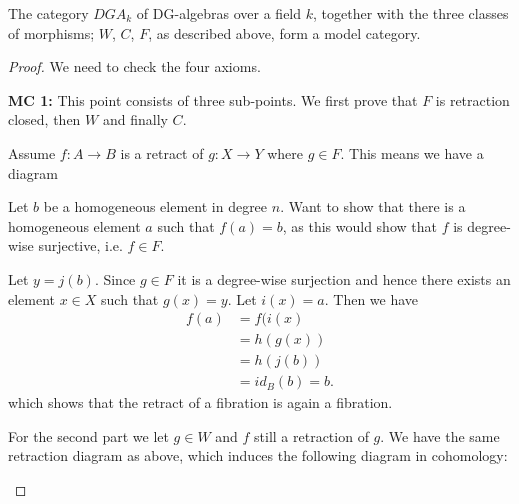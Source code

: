 



\begin{theorem}
The category $DGA_k$ of DG-algebras over a field $k$, together with the three classes of morphisms; $W$, $C$, $F$, as described above, form a model category.
\end{theorem}

\begin{proof}
We need to check the four axioms. 

\textbf{MC 1:} This point consists of three sub-points. We first prove that $F$ is retraction closed, then $W$ and finally $C$. 

Assume $f:A\longrightarrow B$ is a retract of $g:X\longrightarrow Y$ where $g\in F$. This means we have a diagram

\begin{center}
\end{center}

Let $b$ be a homogeneous element in degree $n$. Want to show that there is a homogeneous element $a$ such that $f(a)=b$, as this would show that $f$ is degree-wise surjective, i.e. $f\in F$. 
    
Let $y = j(b)$. Since $g\in F$ it is a degree-wise surjection and hence there exists an element $x\in X$ such that $g(x)=y$. Let $i(x)=a$. Then we have 
\begin{align*}
    f(a) 
    &= f(i(x) \\
    &= h(g(x)) \\
    &= h(j(b)) \\
    &= id_B(b) = b.
\end{align*}
which shows that the retract of a fibration is again a fibration. 

For the second part we let $g\in W$ and $f$ still a retraction of $g$. We have the same retraction diagram as above, which induces the following diagram in cohomology:
\begin{center}
\end{center}


\end{proof}
